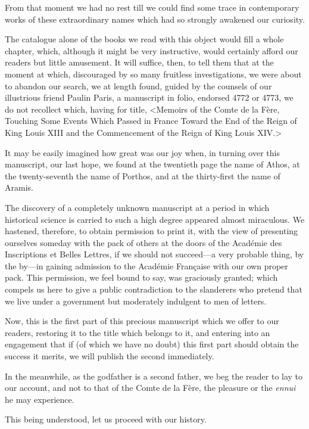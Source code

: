 From that moment we had no rest till we could find some trace in contemporary works of these extraordinary names which had so strongly awakened our curiosity. 

The catalogue alone of the books we read with this object would fill a whole chapter, which, although it might be very instructive, would certainly afford our readers but little amusement. It will suffice, then, to tell them that at the moment at which, discouraged by so many fruitless investigations, we were about to abandon our search, we at length found, guided by the counsels of our illustrious friend Paulin Paris, a manuscript in folio, endorsed 4772 or 4773, we do not recollect which, having for title, <Memoirs of the Comte de la Fère, Touching Some Events Which Passed in France Toward the End of the Reign of King Louis XIII and the Commencement of the Reign of King Louis XIV.>

It may be easily imagined how great was our joy when, in turning over this manuscript, our last hope, we found at the twentieth page the name of Athos, at the twenty-seventh the name of Porthos, and at the thirty-first the name of Aramis. 

The discovery of a completely unknown manuscript at a period in which historical science is carried to such a high degree appeared almost miraculous. We hastened, therefore, to obtain permission to print it, with the view of presenting ourselves someday with the pack of others at the doors of the Académie des Inscriptions et Belles Lettres, if we should not succeed---a very probable thing, by the by---in gaining admission to the Académie Française with our own proper pack. This permission, we feel bound to say, was graciously granted; which compels us here to give a public contradiction to the slanderers who pretend that we live under a government but moderately indulgent to men of letters. 

Now, this is the first part of this precious manuscript which we offer to our readers, restoring it to the title which belongs to it, and entering into an engagement that if (of which we have no doubt) this first part should obtain the success it merits, we will publish the second immediately. 

In the meanwhile, as the godfather is a second father, we beg the reader to lay to our account, and not to that of the Comte de la Fère, the pleasure or the \textit{ennui} he may experience. 

This being understood, let us proceed with our history.